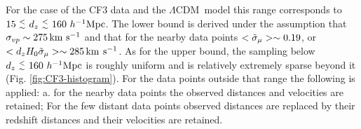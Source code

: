 \documentclass[useAMS,usenatbib]{mn2e}
\def\lesssim{{^<_\sim}}
\newcommand{\kms}{{\,\rm km \ s^{-1}}}
\newcommand{\hmpc}{{\ifmmode{h^{-1}{\rm Mpc}}\else{$h^{-1}$Mpc}\fi}}
\newcommand{\LCDM}{{$\Lambda$CDM}}
\begin{document}
For the case of the CF3 data and the \LCDM\  model this range corresponds to $15\  \lesssim\  d_z\ \lesssim\ 160\  \hmpc$. The lower bound is derived under the assumption that  $\sigma_{vp}\sim 275 \kms$ and that for the nearby data points $\large<\tilde{\sigma}_\mu\large> \sim  0.19$, or $\large<d_z H_0 \tilde{\sigma}_\mu\large> \sim  285 \kms$. As for the upper bound, the sampling below $ d_z\ \lesssim\ 160\  \hmpc$ is roughly uniform and is relatively extremely sparse beyond it (Fig. \ref{fig:CF3-histogram}). For the data points outside that range the following is applied: a. for the nearby data points the observed distances and velocities are retained; For the few distant data points observed distances are replaced by their redshift distances and their velocities are retained.


%

\end{document}
